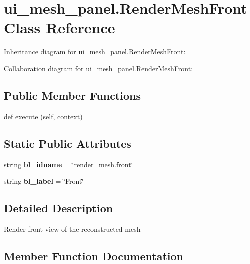 \hypertarget{classui__mesh__panel_1_1RenderMeshFront}{}\section{ui\+\_\+mesh\+\_\+panel.\+Render\+Mesh\+Front Class Reference}
\label{classui__mesh__panel_1_1RenderMeshFront}


Inheritance diagram for ui\+\_\+mesh\+\_\+panel.\+Render\+Mesh\+Front\+:


Collaboration diagram for ui\+\_\+mesh\+\_\+panel.\+Render\+Mesh\+Front\+:
\subsection*{Public Member Functions}
\begin{DoxyCompactItemize}
\item 
def \hyperlink{classui__mesh__panel_1_1RenderMeshFront_a6e0281e46bcc1b069940724c9f4f6c86}{execute} (self, context)
\end{DoxyCompactItemize}
\subsection*{Static Public Attributes}
\begin{DoxyCompactItemize}
\item 
string {\bfseries bl\+\_\+idname} = \char`\"{}render\+\_\+mesh.\+front\char`\"{}\hypertarget{classui__mesh__panel_1_1RenderMeshFront_a61e9aa7ef618d82411c0b4e7f1fc970a}{}\label{classui__mesh__panel_1_1RenderMeshFront_a61e9aa7ef618d82411c0b4e7f1fc970a}

\item 
string {\bfseries bl\+\_\+label} = \char`\"{}Front\char`\"{}\hypertarget{classui__mesh__panel_1_1RenderMeshFront_a69d2ee5844581c9418f2391c84c55678}{}\label{classui__mesh__panel_1_1RenderMeshFront_a69d2ee5844581c9418f2391c84c55678}

\end{DoxyCompactItemize}


\subsection{Detailed Description}
\begin{DoxyVerb}Render front view of the reconstructed mesh\end{DoxyVerb}
 

\subsection{Member Function Documentation}
